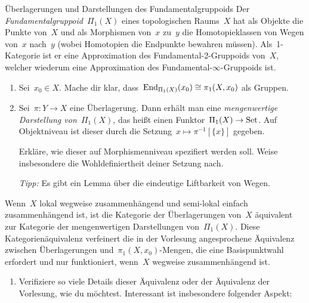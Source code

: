 \documentclass{uebblatt}
\begin{document}
\begin{aufgabe}{Überlagerungen und Darstellungen des Fundamentalgruppoids}
%
Der \emph{Fundamentalgruppoid}~$\Pi_1(X)$ eines topologischen Raums~$X$ hat als
Objekte die Punkte von~$X$ und als Morphismen von~$x$ zu~$y$ die Homotopieklassen
von Wegen von~$x$ nach~$y$ (wobei Homotopien die Endpunkte bewahren müssen).
Als~1-Kategorie ist er eine Approximation des Fundamental-2-Gruppoids von~$X$,
welcher wiederum eine Approximation des Fundamental-$\infty$-Gruppoids ist.
\begin{enumerate}
\item Sei~$x_0 \in X$. Mache dir klar, dass~$\mathrm{End}_{\Pi_1(X)}(x_0) \cong
\pi_1(X,x_0)$ als Gruppen.
\item Sei~$\pi : Y \to X$ eine Überlagerung. Dann erhält man eine
\emph{mengenwertige Darstellung von~$\Pi_1(X)$}, das heißt einen
Funktor~$\Pi_1(X) \to \mathrm{Set}$. Auf Objektniveau ist dieser durch die Setzung~$x
\mapsto \pi^{-1}[\{x\}]$ gegeben.

Erkläre, wie dieser auf Morphismenniveau spezifiert werden soll. Weise
insbesondere die Wohldefiniertheit deiner Setzung nach.

\emph{Tipp:} Es gibt ein Lemma über die eindeutige Liftbarkeit von Wegen.
\end{enumerate}
Wenn~$X$ lokal wegweise zusammenhängend und semi-lokal einfach
zusammenhängend ist, ist die Kategorie der Überlagerungen von~$X$
äquivalent zur Kategorie der mengenwertigen Darstellungen
von~$\Pi_1(X)$. Diese Kategorienäquivalenz verfeinert die in der Vorlesung
angesprochene Äquivalenz zwischen Überlagerungen und~$\pi_1(X,x_0)$-Mengen, die
eine Basispunktwahl erfordert und nur funktioniert, wenn~$X$ wegweise
zusammenhängend ist.
\begin{enumerate}
\addtocounter{enumi}{2}
\item Verifiziere so viele Details dieser Äquivalenz oder der Äquivalenz der
Vorlesung, wie du möchtest. Interessant ist insbesondere folgender Aspekt:


\end{enumerate}
\end{aufgabe}
\end{document}
